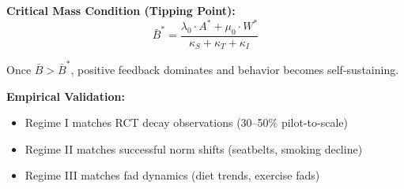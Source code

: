 \begin{tcolorbox}[colback=green!5!white, colframe=green!75!black,
    title=\textbf{Theorem NTM-T7: Stability Analysis and Phase Diagram}]
\textbf{Critical Mass Condition (Tipping Point):}
\begin{equation}
\bar{B}^* = \frac{\lambda_0 \cdot A^* + \mu_0 \cdot W^*}{\kappa_S + \kappa_T + \kappa_I}
\end{equation}

Once $\bar{B} > \bar{B}^*$, positive feedback dominates and behavior becomes self-sustaining.

\textbf{Empirical Validation:}
\begin{itemize}[nosep]
\item Regime I matches RCT decay observations (30--50\% pilot-to-scale) \citep{PAP-dellavigna2022rcts}
\item Regime II matches successful norm shifts (seatbelts, smoking decline) \citep{cialdini2004social}
\item Regime III matches fad dynamics (diet trends, exercise fads) \citep{PAP-rogers2003diffusion}
\end{itemize}

\end{tcolorbox}

